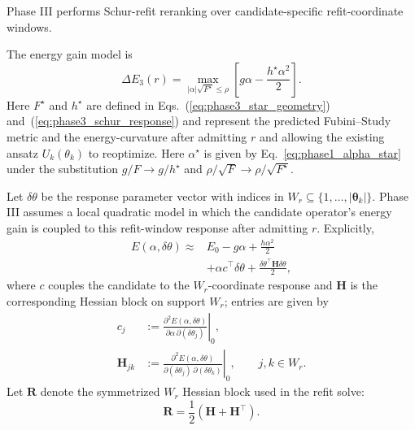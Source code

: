 \documentclass[
  reprint,
  amsmath,
  amssymb,
  aps,
  pra,
  nofootinbib,
  superscriptaddress,
  floatfix
]{revtex4-2}
\begin{document}
Phase III performs Schur-refit reranking over candidate-specific refit-coordinate windows.

The energy gain model is
\begin{equation}
\Delta E_{3}(r)=
\max_{|\alpha|\sqrt{F^\star}\le\rho}
\left[g\alpha-\frac{h^\star \alpha^2}{2}\right].
\label{eq:phase3_gain}
\end{equation}
Here $F^\star$ and $h^\star$ are defined in Eqs.~(\ref{eq:phase3_star_geometry}) and~(\ref{eq:phase3_schur_response}) and represent the predicted Fubini--Study metric and the energy-curvature after admitting $r$ and allowing the existing ansatz $U_k(\theta_k)$ to reoptimize. Here $\alpha^\star$ is given by Eq.~\ref{eq:phase1_alpha_star} under the substitution $g/F \to g/h^\star$ and $\rho / \sqrt{F} \to \rho / \sqrt{F^\star}$.

Let $\delta\theta$ be the response parameter vector with indices in \(W_r\subseteq\{1,\ldots,|\boldsymbol{\theta}_k|\}\). Phase III assumes a local quadratic model in which the candidate operator's energy gain is coupled to this refit-window response after admitting $r$.
Explicitly, 
\begin{equation}
\begin{split}
E(\alpha,\delta\theta)\approx{}&E_0-g\alpha+\frac{h\alpha^2}{2} \\
&+\alpha c^{\top}\delta\theta
+\frac{\delta\theta^{\top}\mathbf H\delta\theta}{2},
\end{split}
\label{eq:local_quadratic}
\end{equation}
where $c$ couples the candidate to the \(W_r\)-coordinate response and \(\mathbf H\) is the corresponding Hessian block on support \(W_r\); entries are given by
\begin{equation}
\begin{aligned}
c_j&:=
\left.
\frac{\partial^2E(\alpha,\delta\theta)}
{\partial\alpha\,\partial(\delta\theta_j)}
\right|_0,\\
\mathbf H_{jk}&:=
\left.
\frac{\partial^2E(\alpha,\delta\theta)}
{\partial(\delta\theta_j)\,\partial(\delta\theta_k)}
\right|_0,
\qquad j,k\in W_r .
\end{aligned}
\label{eq:phase3_window_derivatives}
\end{equation}
Let \(\mathbf R\) denote the symmetrized \(W_r\) Hessian block used in the refit solve:
\begin{equation}
\mathbf R=\frac12(\mathbf H+\mathbf H^{\top}).
\label{eq:phase3_regularized_hessian}
\end{equation}
\end{document}
